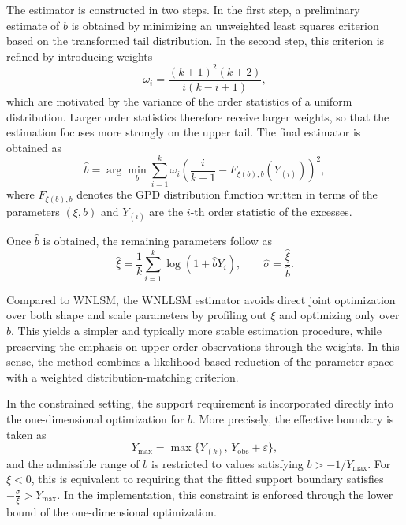 The estimator is constructed in two steps. In the first step, a preliminary estimate of $b$ is obtained by minimizing an unweighted least squares criterion based on the transformed tail distribution. In the second step, this criterion is refined by introducing weights
\begin{equation}
\omega_i = \frac{(k+1)^2(k+2)}{i(k-i+1)},
\end{equation}
which are motivated by the variance of the order statistics of a uniform distribution. Larger order statistics therefore receive larger weights, so that the estimation focuses more strongly on the upper tail. The final estimator is obtained as
\begin{equation}
\hat{b}
=
\arg\min_b
\sum_{i=1}^k
\omega_i
\left(
\frac{i}{k+1}
-
F_{\xi(b),b}(Y_{(i)})
\right)^2,
\end{equation}
where $F_{\xi(b),b}$ denotes the GPD distribution function written in terms of the parameters $(\xi,b)$ and $Y_{(i)}$ are the $i$-th order statistic of the excesses.

Once $\hat{b}$ is obtained, the remaining parameters follow as
\begin{equation}
\hat{\xi} = \frac{1}{k}\sum_{i=1}^k \log(1 + \hat{b}Y_i),
\qquad
\hat{\sigma} = \frac{\hat{\xi}}{\hat{b}}.
\end{equation}

Compared to WNLSM, the WNLLSM estimator avoids direct joint optimization over both shape and scale parameters by profiling out $\xi$ and optimizing only over $b$. This yields a simpler and typically more stable estimation procedure, while preserving the emphasis on upper-order observations through the weights. In this sense, the method combines a likelihood-based reduction of the parameter space with a weighted distribution-matching criterion. 

In the constrained setting, the support requirement is incorporated directly into the one-dimensional optimization for $b$. More precisely, the effective boundary is taken as
\begin{equation}
Y_{\max} = \max\{Y_{(k)},\, Y_{\mathrm{obs}}+\varepsilon\},
\end{equation}
and the admissible range of $b$ is restricted to values satisfying $b > -1/Y_{\max}$.
For $\xi < 0$, this is equivalent to requiring that the fitted support boundary satisfies
$-\frac{\sigma}{\xi} > Y_{\max}$.
In the implementation, this constraint is enforced through the lower bound of the one-dimensional optimization.

